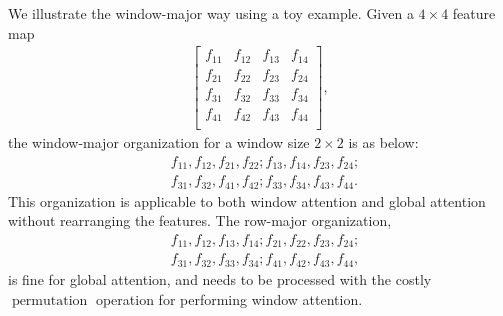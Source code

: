 \documentclass[runningheads]{llncs}
\begin{document}
We illustrate the window-major way using a toy example. 
Given a $4\times 4$ feature map
\begin{align}
\begin{bmatrix}
f_{11} & f_{12} & f_{13} & f_{14}\\
f_{21} & f_{22} & f_{23} & f_{24}\\
f_{31} & f_{32} & f_{33} & f_{34}\\
f_{41} & f_{42} & f_{43} & f_{44}\\
\end{bmatrix},
\end{align}
the window-major organization for a window size $2 \times 2$
is as below:
\begin{equation}
\begin{aligned}
    &f_{11}, f_{12}, f_{21}, f_{22};
    f_{13}, f_{14}, f_{23}, f_{24};\\
    &f_{31}, f_{32}, f_{41}, f_{42}; 
    f_{33}, f_{34}, f_{43}, f_{44}.
\end{aligned}
\end{equation}
This organization is applicable to both window attention and global attention without rearranging the features. The row-major organization,
\begin{equation}
\begin{aligned}
&f_{11}, f_{12}, f_{13}, f_{14};
f_{21}, f_{22}, f_{23}, f_{24};\\
&f_{31}, f_{32}, f_{33}, f_{34};
f_{41}, f_{42}, f_{43}, f_{44},
\end{aligned}
\end{equation}
is fine for global attention, and needs to be processed with the costly $\operatorname{permutation}$ operation for performing window attention. 
\end{document}

